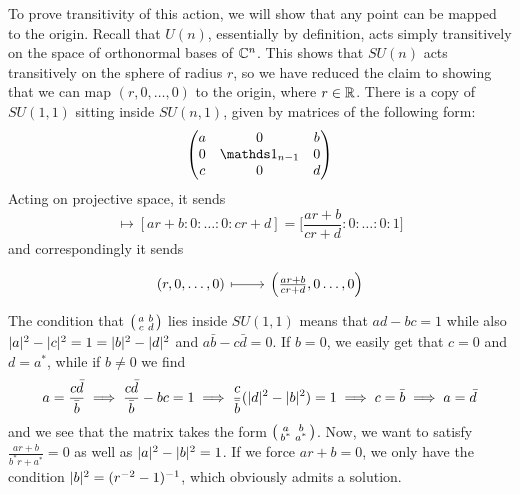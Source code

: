 \documentclass[parskip=half]{scrartcl}
\begin{document}
To prove transitivity of this action, we will show that any point can be mapped to the origin. Recall that $U(n)$, essentially by definition, acts simply transitively on the space of orthonormal bases of $\mathbb{C}^n$. This shows that $SU(n)$ acts transitively on the sphere of radius $r$, so we have reduced the claim to showing that we can map $(r,0,\dots,0)$ to the origin, where $r\in \mathbb{R}$. There is a copy of $SU(1,1)$ sitting inside $SU(n,1)$, given by matrices of the following form:
\begin{equation*}
	\begin{pmatrix}
		a 	& 0				& b \\ 
		0 	&\Unit_{n-1} 	& 0 \\
		c 	& 0				& d
	\end{pmatrix}
\end{equation*}
Acting on projective space, it sends
\begin{equation*}
	[r:0:\dots:0:1]\mapsto [ar+b:0:\dots:0:cr+d]=\bigg[\frac{ar+b}{cr+d}:0:\dots: 0 : 1\bigg]
\end{equation*}
and correspondingly it sends
\begin{equation*}
	\begin{tikzcd}
		(r,0,\dots, 0) \ar[r,mapsto] & \Big(\frac{ar+b}{cr+d},0\dots,0\Big)
	\end{tikzcd}
\end{equation*}
The condition that 
$\begin{psmallmatrix}
	a & b \\ c & d
\end{psmallmatrix}$ lies inside $SU(1,1)$ means that $ad-bc=1$ while also $\lvert a \rvert^2-\lvert c \rvert^2=1=\lvert b \rvert^2-\lvert d \rvert^2$ and $a\bar b-c \bar d=0$. If $b=0$, we easily get that $c=0$ and $d=a^*$, while if $b\neq 0$ we find
\begin{equation*}
	a=\frac{c\bar d }{\bar b}\implies \frac{c\bar d}{\bar b}-bc=1
	\implies \frac{c}{\bar b}(\lvert d \rvert^2-\lvert b \rvert^2)=1\implies c=\bar b\implies a=\bar d
\end{equation*}
and we see that the matrix takes the form
$\begin{psmallmatrix}
a & b \\ b^* & a^*
\end{psmallmatrix}$. Now, we want to satisfy $\frac{ar+b}{b^*r+a^*}=0$ as well as $\lvert a \rvert^2-\lvert b \rvert^2=1$. If we force $ar+b=0$, we only have the condition $\lvert b \rvert^2=(r^{-2}-1)^{-1}$, which obviously admits a solution.
\end{document}
